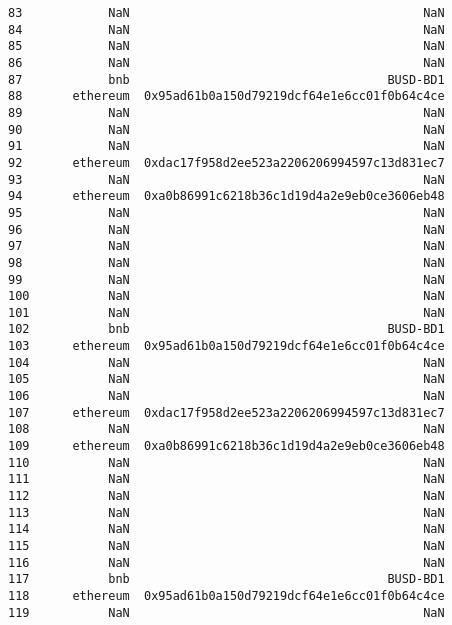 \documentclass[11pt]{article}
\begin{document}
\begin{tcolorbox}[breakable, size=fbox, boxrule=.5pt, pad at break*=1mm, opacityfill=0]
\begin{Verbatim}[commandchars=\\\{\}]
83            NaN                                         NaN
84            NaN                                         NaN
85            NaN                                         NaN
86            NaN                                         NaN
87            bnb                                    BUSD-BD1
88       ethereum  0x95ad61b0a150d79219dcf64e1e6cc01f0b64c4ce
89            NaN                                         NaN
90            NaN                                         NaN
91            NaN                                         NaN
92       ethereum  0xdac17f958d2ee523a2206206994597c13d831ec7
93            NaN                                         NaN
94       ethereum  0xa0b86991c6218b36c1d19d4a2e9eb0ce3606eb48
95            NaN                                         NaN
96            NaN                                         NaN
97            NaN                                         NaN
98            NaN                                         NaN
99            NaN                                         NaN
100           NaN                                         NaN
101           NaN                                         NaN
102           bnb                                    BUSD-BD1
103      ethereum  0x95ad61b0a150d79219dcf64e1e6cc01f0b64c4ce
104           NaN                                         NaN
105           NaN                                         NaN
106           NaN                                         NaN
107      ethereum  0xdac17f958d2ee523a2206206994597c13d831ec7
108           NaN                                         NaN
109      ethereum  0xa0b86991c6218b36c1d19d4a2e9eb0ce3606eb48
110           NaN                                         NaN
111           NaN                                         NaN
112           NaN                                         NaN
113           NaN                                         NaN
114           NaN                                         NaN
115           NaN                                         NaN
116           NaN                                         NaN
117           bnb                                    BUSD-BD1
118      ethereum  0x95ad61b0a150d79219dcf64e1e6cc01f0b64c4ce
119           NaN                                         NaN


\end{Verbatim}
\end{tcolorbox}
\end{document}
